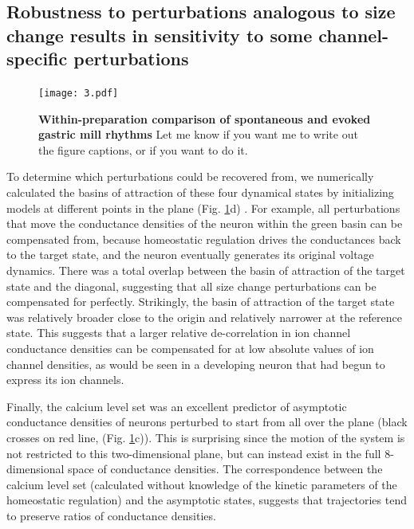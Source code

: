 \documentclass[9pt,lineno]{elife}
\begin{document}
\subsection{Robustness to perturbations analogous to size change results in sensitivity to some channel-specific perturbations}


\begin{figure}
\begin{fullwidth}
\texttt{[image: 3.pdf]}

\caption{\textbf{Within-preparation comparison of spontaneous and evoked gastric mill rhythms} Let me know if you want me to write out the figure captions, or if you want to do it.  }
\label{fig:2}
\end{fullwidth}
\end{figure}


To determine which perturbations could be recovered from, we numerically calculated the basins of attraction of these four dynamical states by initializing models at different points in the plane (Fig. \ref{fig:2}d) . For example, all perturbations that move the conductance densities of the neuron within the green basin can be compensated from, because homeostatic regulation drives the conductances back to the target state, and the neuron eventually generates its original voltage dynamics. There was a total overlap between the basin of attraction of the target state and the diagonal, suggesting that all size change perturbations can be compensated for perfectly. Strikingly, the basin of attraction of the target state was relatively broader close to the origin and relatively narrower at the reference state. This suggests that a larger relative de-correlation in ion channel conductance densities can be compensated for at low absolute values of ion channel densities, as would be seen in a developing neuron that had begun to express its ion channels.

Finally, the calcium level set was an excellent predictor of asymptotic conductance densities of neurons perturbed to start from all over the plane (black crosses on red line, (Fig. \ref{fig:2}c)). This is surprising since the motion of the system is not restricted to this two-dimensional plane, but can instead exist in the full 8-dimensional space of conductance densities. The correspondence between the calcium level set (calculated without knowledge of the kinetic parameters of the homeostatic regulation) and the asymptotic states, suggests that trajectories tend to preserve ratios of conductance densities. 
\end{document}
